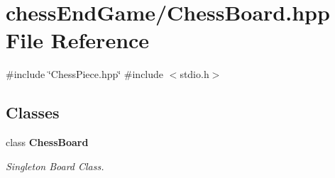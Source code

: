 \section{chess\+End\+Game/\+Chess\+Board.hpp File Reference}
\label{_chess_board_8hpp}
{\ttfamily \#include \char`\"{}Chess\+Piece.\+hpp\char`\"{}}\newline
{\ttfamily \#include $<$stdio.\+h$>$}\newline
\subsection*{Classes}
\begin{DoxyCompactItemize}
\item 
class \textbf{ Chess\+Board}
\begin{DoxyCompactList}\small\item\em Singleton Board Class. \end{DoxyCompactList}\end{DoxyCompactItemize}
